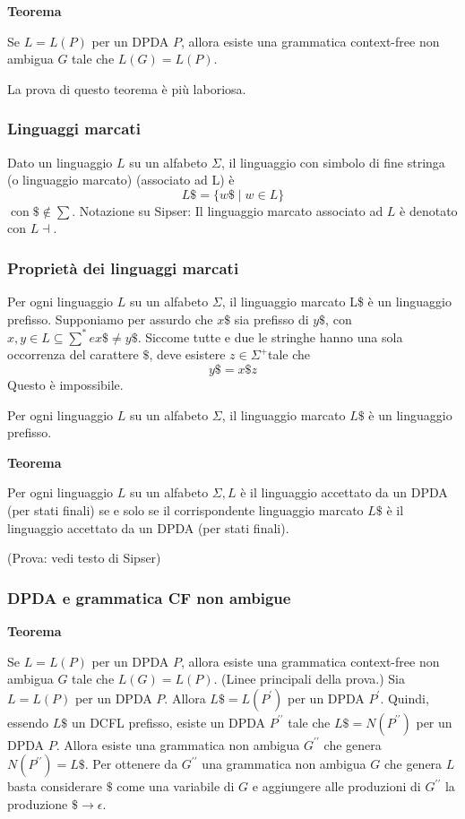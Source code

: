 \textbf{Teorema}

Se $L=L(P)$ per un DPDA $P$, allora esiste una grammatica context-free non ambigua $G$ tale che $L(G)=L(P)$.


La prova di questo teorema è più laboriosa.

\subsubsection{Linguaggi marcati}

Dato un linguaggio $L$ su un alfabeto $\Sigma$, il linguaggio con simbolo di fine stringa (o linguaggio marcato) (associato ad L) è
$$
L \$=\{w \$ \mid w \in L\}
$$
$\operatorname{con} \$ \notin \sum .$
Notazione su Sipser: Il linguaggio marcato associato ad $L$ è denotato con $L \dashv$.

\subsubsection{Proprietà dei linguaggi marcati}

Per ogni linguaggio $L$ su un alfabeto $\Sigma$, il linguaggio marcato L\$ è un linguaggio prefisso.
Supponiamo per assurdo che $x \$$ sia prefisso di $y \$$, con $x, y \in L \subseteq \sum^{*} e x \$ \neq y \$$.
Siccome tutte e due le stringhe hanno una sola occorrenza del carattere $\$$, deve esistere $z \in \Sigma^{+}$tale che
$$
y \$=x \$ z
$$
Questo è impossibile.

\vspace{5mm}

Per ogni linguaggio $L$ su un alfabeto $\Sigma$, il linguaggio marcato $L \$$ è un linguaggio prefisso.


\textbf{Teorema}

Per ogni linguaggio $L$ su un alfabeto $\Sigma, L$ è il linguaggio accettato da un DPDA (per stati finali) se e solo se il corrispondente linguaggio marcato $L \$$ è il linguaggio accettato da un DPDA (per stati finali).

\vspace{5mm}

(Prova: vedi testo di Sipser)

\subsubsection{DPDA e grammatica CF non ambigue}

\textbf{Teorema}


Se $L=L(P)$ per un DPDA $P$, allora esiste una grammatica context-free non ambigua $G$ tale che $L(G)=L(P)$.
(Linee principali della prova.)
Sia $L=L(P)$ per un DPDA $P$.
Allora $L \$=L\left(P^{\prime}\right)$ per un DPDA $P^{\prime}$.
Quindi, essendo $L \$$ un DCFL prefisso, esiste un DPDA $P^{\prime \prime}$ tale che $L \$=N\left(P^{\prime \prime}\right)$ per un DPDA $P$.
Allora esiste una grammatica non ambigua $G^{\prime \prime}$ che genera $N\left(P^{\prime \prime}\right)=L \$ .$
Per ottenere da $G^{\prime \prime}$ una grammatica non ambigua $G$ che genera $L$ basta considerare $\$$ come una variabile di $G$ e aggiungere alle produzioni di $G^{\prime \prime}$ la produzione $\$ \rightarrow \epsilon$.


